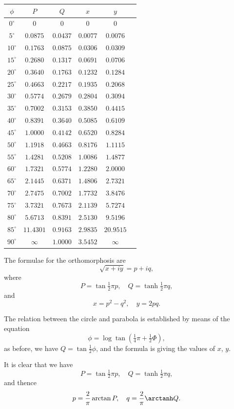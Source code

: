 \documentclass[11pt,a4paper]{book}
\begin{document}
\begin{tabular}{ccc|ccc}
$\phi$ & $P$ & $Q$ & $x$ & $y$ \\
\hline
$0^\circ$ & $0$ & $0$ & $0$ & $0$ \\
$5^\circ$ & $0.0875$ & $0.0437$ & $0.0077$ & $0.0076$ \\
$10^\circ$ & $0.1763$ & $0.0875$ & $0.0306$ & $0.0309$ \\
$15^\circ$ & $0.2680$ & $0.1317$ & $0.0691$ & $0.0706$ \\
$20^\circ$ & $0.3640$ & $0.1763$ & $0.1232$ & $0.1284$ \\
$25^\circ$ & $0.4663$ & $0.2217$ & $0.1935$ & $0.2068$ \\
$30^\circ$ & $0.5774$ & $0.2679$ & $0.2804$ & $0.3094$ \\
$35^\circ$ & $0.7002$ & $0.3153$ & $0.3850$ & $0.4415$ \\
$40^\circ$ & $0.8391$ & $0.3640$ & $0.5085$ & $0.6109$ \\
$45^\circ$ & $1.0000$ & $0.4142$ & $0.6520$ & $0.8284$ \\
$50^\circ$ & $1.1918$ & $0.4663$ & $0.8176$ & $1.1115$ \\
$55^\circ$ & $1.4281$ & $0.5208$ & $1.0086$ & $1.4877$ \\
$60^\circ$ & $1.7321$ & $0.5774$ & $1.2280$ & $2.0000$ \\
$65^\circ$ & $2.1445$ & $0.6371$ & $1.4806$ & $2.7321$ \\
$70^\circ$ & $2.7475$ & $0.7002$ & $1.7732$ & $3.8476$ \\
$75^\circ$ & $3.7321$ & $0.7673$ & $2.1139$ & $5.7274$ \\
$80^\circ$ & $5.6713$ & $0.8391$ & $2.5130$ & $9.5196$ \\
$85^\circ$ & $11.4301$ & $0.9163$ & $2.9835$ & $20.9515$ \\
$90^\circ$ & $\infty$ & $1.0000$ & $3.5452$ & $\infty$
\end{tabular}

\bigskip

The formulae for the orthomorphosis are
\[
\sqrt{x+iy} = p + iq,
\]
where
\[
P = \tan \tfrac{1}{2}\pi p, \quad Q = \tanh \tfrac{1}{2}\pi q,
\]
and
\[
x = p^2 - q^2, \quad y = 2pq.
\]

The relation between the circle and parabola is established by means of the equation
\[
\phi = \log \tan(\tfrac{1}{4}\pi + \tfrac{1}{2}\Phi),
\]
as before, we have $Q = \tan \tfrac{1}{2}\phi$, and the formula is giving the values of $x$, $y$.

It is clear that we have
\[
P = \tan \tfrac{1}{2}\pi p, \quad Q = \tanh \tfrac{1}{2}\pi q,
\]
and thence
\[
p = \frac{2}{\pi}\arctan P, \quad q = \frac{2}{\pi}\arctanh Q.
\]
\end{document}
